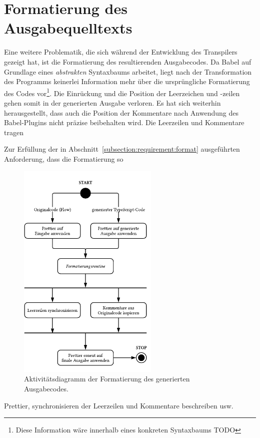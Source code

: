\section{Formatierung des Ausgabequelltexts}

Eine weitere Problematik, die sich während der Entwicklung des Transpilers gezeigt hat, ist die Formatierung des resultierenden Ausgabecodes. Da Babel auf Grundlage eines \emph{abstrakten} Syntaxbaums arbeitet, liegt nach der Transformation des Programms keinerlei Information mehr über die ursprüngliche Formatierung des Codes vor\footnote{Diese Information wäre innerhalb eines konkreten Syntaxbaums TODO}. Die Einrückung und die Position der Leerzeichen und -zeilen gehen somit in der generierten Ausgabe verloren. Es hat sich weiterhin herausgestellt, dass auch die Position der Kommentare nach Anwendung des Babel-Plugins nicht präzise beibehalten wird. Die Leerzeilen und Kommentare tragen

Zur Erfüllung der in Abschnitt~\ref{subsection:requirement:format} ausgeführten Anforderung, dass die Formatierung so

\begin{figure}[htbp]
  \centering
  \includegraphics[width=0.6\textwidth]{src/4_Umsetzung/fig/activity-diagram-formatting.pdf}
	\caption[Aktivitätsdiagramm der Formatierung des Ausgabecodes]{Aktivitätsdiagramm der Formatierung des generierten Ausgabecodes.}
	\label{fig:activity-diagram-formatting}
\end{figure}

Prettier, synchronisieren der Leerzeilen und Kommentare beschreiben usw.

